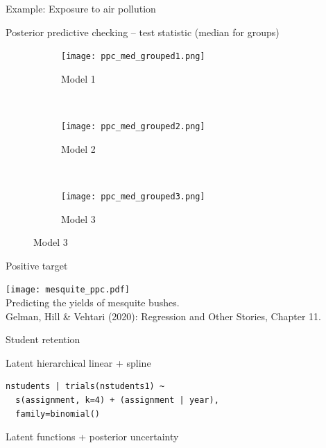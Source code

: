 \documentclass[t]{beamer}
\begin{document}
\begin{frame}{Example: Exposure to air pollution}


  Posterior predictive checking -- test statistic (median for groups)

  \begin{figure}
\centering
\begin{subfigure}{.31\textwidth}
\texttt{[image: ppc\_med\_grouped1.png]}
\caption{Model 1}
\end{subfigure}
~
\begin{subfigure}{.31\textwidth}
\texttt{[image: ppc\_med\_grouped2.png]}
\caption{Model 2}
\end{subfigure}
~
\begin{subfigure}{.31\textwidth}
\texttt{[image: ppc\_med\_grouped3.png]}
\caption{Model 3}
\end{subfigure}

\end{figure}

\end{frame}

\begin{frame}{Positive target}
  
    \texttt{[image: mesquite\_ppc.pdf]}\\
  \vspace{-0.1\baselineskip} {Predicting the yields of mesquite bushes.\\
    \color{gray} \footnotesize
    Gelman, Hill \& Vehtari (2020): Regression and Other Stories, Chapter 11.}\\

\end{frame}

\begin{frame}[fragile]{Student retention}

  Latent hierarchical linear + spline

{\footnotesize
\begin{verbatim}
nstudents | trials(nstudents1) ~
  s(assignment, k=4) + (assignment | year),
  family=binomial()
\end{verbatim}
}

  Latent functions + posterior uncertainty\\\hspace{-5mm}

  
\end{frame}
\end{document}
